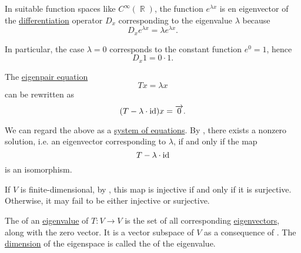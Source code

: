 \begin{example}
\begin{thmenum}
     In suitable function spaces like \( C^\infty(\BbbR) \), the function \( e^{\lambda x} \) is en eigenvector of the \hyperref[def:differentiability]{differentiation} operator \( D_x \) corresponding to the eigenvalue \( \lambda \) because
    \begin{equation*}
      D_x e^{\lambda x} = \lambda e^{\lambda x}.
    \end{equation*}

    In particular, the case \( \lambda = 0 \) corresponds to the constant function \( e^0 = 1 \), hence
    \begin{equation*}
      D_x 1 = 0 \cdot 1.
    \end{equation*}
  \end{thmenum}
\end{example}

\begin{remark}\label{rem:eigenpairs_via_invertibility}
  The \hyperref[def:eigenpair]{eigenpair equation}
  \begin{equation*}
    Tx = \lambda x
  \end{equation*}
  can be rewritten as
  \begin{equation*}
    (T - \lambda \cdot \operatorname{id}) x = \overrightarrow{0}.
  \end{equation*}

  We can regard the above as a \hyperref[rem:system_of_equations]{system of equations}. By , there exists a nonzero solution, i.e. an eigenvector corresponding to \( \lambda \), if and only if the map
  \begin{equation*}
    T - \lambda \cdot \operatorname{id}
  \end{equation*}
  is an isomorphism.

  If \( V \) is finite-dimensional, by , this map is injective if and only if it is surjective. Otherwise, it may fail to be either injective or surjective.
\end{remark}

\begin{definition}\label{def:eigenspace}
  The  of an \hyperref[def:eigenpair]{eigenvalue} of \( T: V \to V \) is the set of all corresponding \hyperref[def:eigenpair]{eigenvectors}, along with the zero vector. It is a vector subspace of \( V \) as a consequence of . The \hyperref[thm:vector_space_dimension]{dimension} of the eigenspace is called the  of the eigenvalue.
\end{definition}

